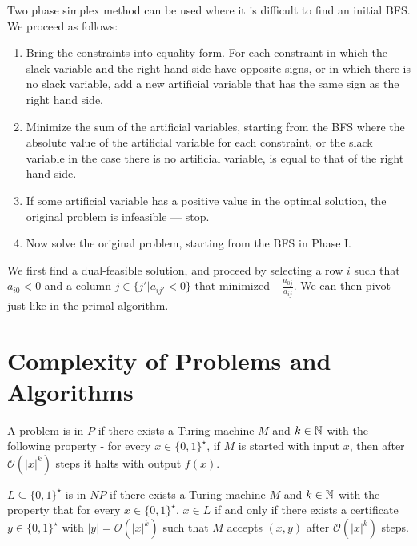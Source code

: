\begin{defn}
  \label{sec:advanc-simpl-proc-1}
  Two phase simplex method can be used where it is difficult to find
  an initial BFS.  We proceed as follows:

  \begin{enumerate}
  \item Bring the constraints into equality form.  For each constraint
    in which the slack variable and the right hand side have opposite
    signs, or in which there is no slack variable, add a new
    artificial variable that has the same sign as the right hand side.
  \item Minimize the sum of the artificial variables, starting from
    the BFS where the absolute value of the artificial variable for
    each constraint, or the slack variable in the case there is no
    artificial variable, is equal to that of the right hand side.
  \item If some artificial variable has a positive value in the
    optimal solution, the original problem is infeasible --- stop.
  \item Now solve the original problem, starting from the BFS in Phase I.
  \end{enumerate}
\end{defn}

\begin{defn}
  \label{sec:advanc-simpl-proc-2}
  We first find a dual-feasible solution, and proceed by selecting a
  row $i$ such that $a_{i0} < 0$ and a column $j \in \{ j' | a_{ij'} <
0 \} $ that minimized $-\frac{a_{0j}}{a_{ij}}$.  We can then pivot
just like in the primal algorithm.
\end{defn}


\section{Complexity of Problems and Algorithms}
\label{sec:compl-probl-algor}

\begin{defn}
  \label{sec:compl-probl-algor-1}
  A problem is in $P$ if there exists a Turing machine $M$ and $k \in
  \mathbb{N}$ with the following property - for every $x \in \{ 0, 1
  \}^{\star}$, if $M$ is started with input $x$, then after
  $\mathcal{O}(|x|^{k})$ steps it halts with output $f(x)$.

  $L \subseteq \{ 0, 1 \}^{\star} $ is in $NP$ if there exists a
  Turing machine $M$ and $k \in \mathbb{N}$ with the property that for every
  $x \in \{ 0, 1 \}^{\star} $, $x \in L$ if and only if there exists a
  certificate $y \in \{ 0, 1 \}^{\star} $ with $|y| =
  \mathcal{O}(|x|^{k})$ such that $M$ accepts $(x, y)$ after
  $\mathcal{O}(|x|^{k})$ steps.
\end{defn}


